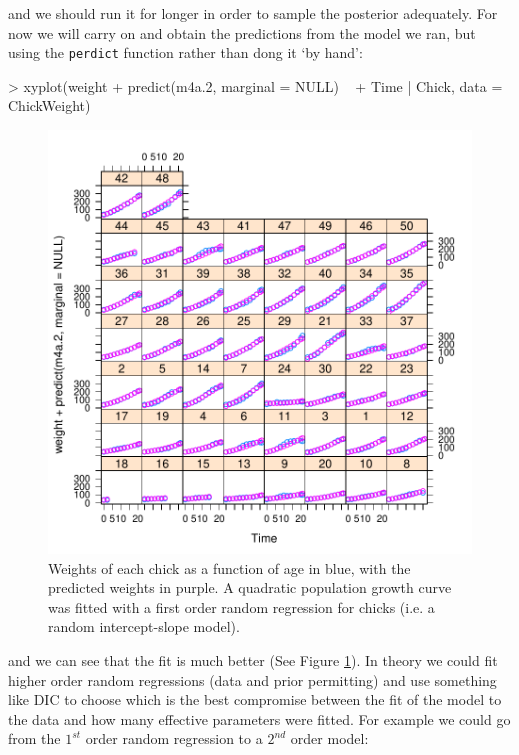 \documentclass{article}
\begin{document}
and we should run it for longer in order to sample the posterior adequately. For now we will carry on and obtain the predictions from the model we ran, but using the \texttt{perdict} function rather than dong it `by hand': 

\begin{Schunk}
\begin{Sinput}
> xyplot(weight + predict(m4a.2, marginal = NULL) ~ 
+     Time | Chick, data = ChickWeight)
\end{Sinput}
\end{Schunk}


\begin{figure}[!h]
\begin{center}
\includegraphics{Lecture4-022}
\end{center}
\caption{Weights of each chick as a function of age in blue, with the predicted weights in purple. A quadratic population growth curve was fitted with a first order random regression for chicks (i.e. a random intercept-slope model).}
\label{CWpred.2-fig}
\end{figure}

and we can see that the fit is much better (See Figure \ref{CWpred.2-fig}). In theory we could fit higher order random regressions (data and prior permitting) and use something like DIC to choose which is the best compromise between the fit of the model to the data and how many effective parameters were fitted. For example we could go from the $1^{st}$ order random regression to a $2^{nd}$ order model: 
\end{document}

